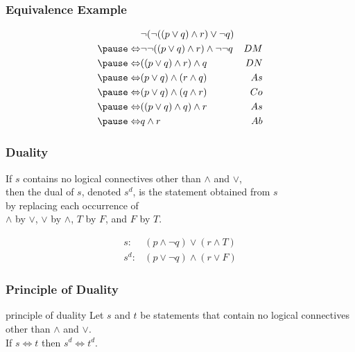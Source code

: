 \documentclass[dvipsnames]{beamer}
\begin{document}
\begin{frame}
  \frametitle{Equivalence Example}

  \begin{example}
    \begin{eqnarray*}
                      & \neg (\neg ((p \vee q) \wedge r) \vee \neg q)      &   \\
      \pause
      \Leftrightarrow & \neg \neg ((p \vee q) \wedge r) \wedge \neg \neg q & DM\\
      \pause
      \Leftrightarrow & ((p \vee q) \wedge r) \wedge q                     & DN\\
      \pause
      \Leftrightarrow & (p \vee q) \wedge (r \wedge q)                     & As\\
      \pause
      \Leftrightarrow & (p \vee q) \wedge (q \wedge r)                     & Co\\
      \pause
      \Leftrightarrow & ((p \vee q) \wedge q) \wedge r                     & As\\
      \pause
      \Leftrightarrow & q \wedge r                                         & Ab
    \end{eqnarray*}
  \end{example}
\end{frame}

\begin{frame}
  \frametitle{Duality}

  \begin{definition}
    If $s$ contains no logical connectives other than $\wedge$ and $\vee$,\\
    then the \alert{dual} of $s$, denoted $s^d$, is the statement obtained
    from $s$\\
    by replacing each occurrence of\\
    $\wedge$ by $\vee$, $\vee$ by $\wedge$, $T$ by $F$, and $F$ by $T$.
  \end{definition}

  \pause
  \begin{example}
    \begin{eqnarray*}
      s:   & (p \wedge \neg q) \vee (r \wedge T)\\
      s^d: & (p \vee \neg q) \wedge (r \vee F)
    \end{eqnarray*}
  \end{example}
\end{frame}

\begin{frame}
  \frametitle{Principle of Duality}

  \begin{block}{principle of duality}
    Let $s$ and $t$ be statements that contain no logical connectives\\
    other than $\wedge$ and $\vee$.\\
    If $s \Leftrightarrow t$ then $s^d \Leftrightarrow t^d$.
  \end{block}
\end{frame}
\end{document}
